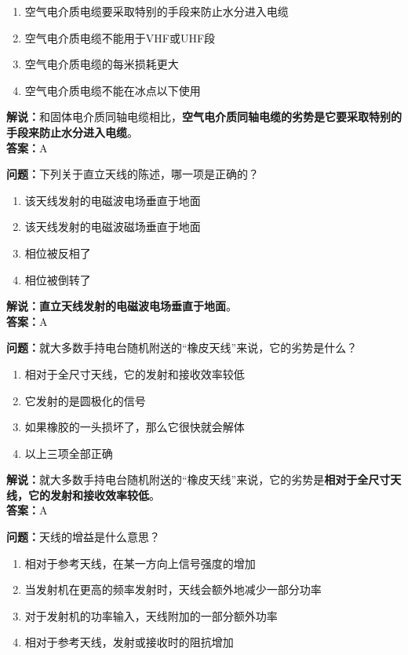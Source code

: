 \begin{enumerate}[label=\Alph*), leftmargin=1cm]
	\item 空气电介质电缆要采取特别的手段来防止水分进入电缆
	\item 空气电介质电缆不能用于VHF或UHF段
	\item 空气电介质电缆的每米损耗更大
	\item 空气电介质电缆不能在冰点以下使用
\end{enumerate}

\textbf{解说：}和固体电介质同轴电缆相比，\textbf{空气电介质同轴电缆的劣势是它要采取特别的手段来防止水分进入电缆}。\\\textbf{答案：}A%



\textbf{问题：}下列关于直立天线的陈述，哪一项是正确的？

\begin{enumerate}[label=\Alph*), leftmargin=1cm]
	\item 该天线发射的电磁波电场垂直于地面
	\item 该天线发射的电磁波磁场垂直于地面
	\item 相位被反相了
	\item 相位被倒转了
\end{enumerate}

\textbf{解说：}\textbf{直立天线发射的电磁波电场垂直于地面}。\\\textbf{答案：}A%



\textbf{问题：}就大多数手持电台随机附送的“橡皮天线”来说，它的劣势是什么？

\begin{enumerate}[label=\Alph*), leftmargin=1cm]
	\item 相对于全尺寸天线，它的发射和接收效率较低
	\item 它发射的是圆极化的信号
	\item 如果橡胶的一头损坏了，那么它很快就会解体
	\item 以上三项全部正确
\end{enumerate}

\textbf{解说：}就大多数手持电台随机附送的“橡皮天线”来说，它的劣势是\textbf{相对于全尺寸天线，它的发射和接收效率较低}。\\\textbf{答案：}A%



\textbf{问题：}天线的增益是什么意思？

\begin{enumerate}[label=\Alph*), leftmargin=1cm]
	\item 相对于参考天线，在某一方向上信号强度的增加
	\item 当发射机在更高的频率发射时，天线会额外地减少一部分功率
	\item 对于发射机的功率输入，天线附加的一部分额外功率
	\item 相对于参考天线，发射或接收时的阻抗增加
\end{enumerate}

